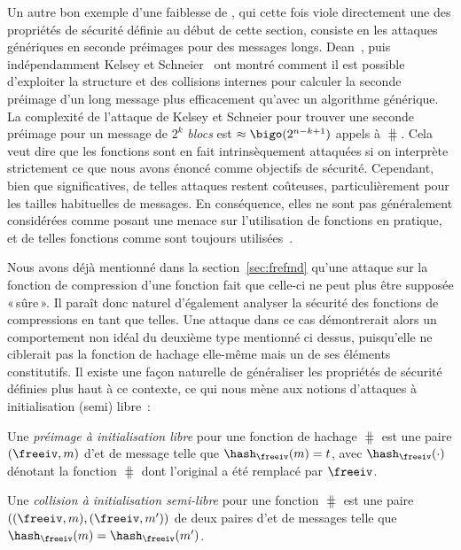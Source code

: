 Un autre bon exemple d'une faiblesse de
\merkdam, qui cette fois viole directement une des propriétés de sécurité définie au début de cette section,
consiste en les attaques génériques en seconde préimages pour des messages longs.
Dean~\cite{dean}, puis indépendamment Kelsey et Schneier~\cite{DBLP:conf/eurocrypt/KelseyS05}
ont montré comment il est possible d'exploiter la structure \merkdam et des collisions internes
pour calculer la seconde préimage d'un long message plus efficacement qu'avec un algorithme générique.
La complexité de l'attaque de Kelsey et Schneier pour trouver une seconde préimage pour un message de
$2^k$ \emph{blocs} est $\approx \bigo(2^{n-k+1})$ appels à $\hash$. Cela veut dire que les fonctions \merkdam sont
en fait intrinsèquement attaquées si on interprète strictement ce que nous avons énoncé comme objectifs de sécurité.
Cependant, bien que significatives, de telles attaques restent coûteuses, particulièrement pour les tailles habituelles
de messages. En conséquence, elles ne sont pas généralement considérées comme posant une menace sur l'utilisation
de fonctions \merkdam en pratique, et de telles fonctions comme \shatwo sont toujours utilisées~\cite{Nist-SHA}.

\bigskip

Nous avons déjà mentionné dans la section~\ref{sec:frefmd} qu'une attaque sur la fonction de compression d'une fonction \merkdam fait que celle-ci
ne peut plus être supposée «\,sûre\,». Il paraît donc naturel d'également analyser la sécurité des fonctions de compressions en tant que telles.
Une attaque dans ce cas démontrerait alors un comportement non idéal du deuxième type mentionné ci dessus, puisqu'elle ne ciblerait
pas la fonction de hachage elle-même mais un de ses éléments constitutifs. Il existe une façon naturelle de généraliser les propriétés
de sécurité définies plus haut à ce contexte, ce qui nous mène aux notions d'attaques à initialisation (semi) libre~:

\begin{fdefi}
Une
\emph{préimage à initialisation libre}
pour une fonction de hachage \merkdam $\hash$ est une paire $(\freeiv,m)$
d'\iv et de message telle que $\hash_\freeiv(m) = t$, avec $\hash_\freeiv(\cdot)$ dénotant
la fonction $\hash$ dont l'\iv original a été remplacé par $\freeiv$.
\end{fdefi}

\begin{fdefi}
Une \emph{collision à initialisation semi-libre} pour une fonction \merkdam $\hash$ est une paire $((\freeiv,m), (\freeiv,m'))$
de deux paires d'\iv et de messages telle que $\hash_\freeiv(m) = \hash_{\freeiv}(m')$.
\end{fdefi}

